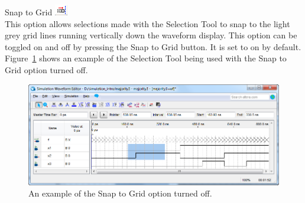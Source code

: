 \documentclass[11pt, twoside, pdftex]{article}
\begin{document}
\begin{description}
	\item {\sf Snap to Grid} \hbox{\includegraphics[scale=0.7]{figures/appendix/icon14.png}}\\
	This option allows selections made with the {\sf Selection Tool} to snap to the light grey 
	grid lines running vertically down the waveform display. 
	This option can be toggled on and off by pressing the {\sf Snap to Grid button}. 
	It is set to on by default. Figure~\ref{fig:fig18} shows an example of the Selection Tool being 
	used with the Snap to Grid option turned off.
	\begin{figure}[H]
	   \begin{center}
	      \includegraphics[scale=0.65]{figures/appendix/figure18.png}
	   \caption{An example of the {\sf Snap to Grid} option turned off.} 
		 \label{fig:fig18}
		 \end{center}
	\end{figure}


\end{description}
\end{document}
